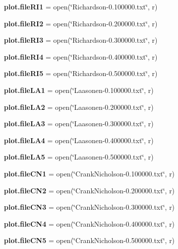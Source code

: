 \begin{DoxyCompactItemize}
\item 
\textbf{ plot.\+file\+R\+I1} = open(\char`\"{}Richardson-\/0.\+100000.txt\char`\"{}, \textquotesingle{}r\textquotesingle{})
\item 
\textbf{ plot.\+file\+R\+I2} = open(\char`\"{}Richardson-\/0.\+200000.txt\char`\"{}, \textquotesingle{}r\textquotesingle{})
\item 
\textbf{ plot.\+file\+R\+I3} = open(\char`\"{}Richardson-\/0.\+300000.txt\char`\"{}, \textquotesingle{}r\textquotesingle{})
\item 
\textbf{ plot.\+file\+R\+I4} = open(\char`\"{}Richardson-\/0.\+400000.txt\char`\"{}, \textquotesingle{}r\textquotesingle{})
\item 
\textbf{ plot.\+file\+R\+I5} = open(\char`\"{}Richardson-\/0.\+500000.txt\char`\"{}, \textquotesingle{}r\textquotesingle{})
\item 
\textbf{ plot.\+file\+L\+A1} = open(\char`\"{}Laasonen-\/0.\+100000.txt\char`\"{}, \textquotesingle{}r\textquotesingle{})
\item 
\textbf{ plot.\+file\+L\+A2} = open(\char`\"{}Laasonen-\/0.\+200000.txt\char`\"{}, \textquotesingle{}r\textquotesingle{})
\item 
\textbf{ plot.\+file\+L\+A3} = open(\char`\"{}Laasonen-\/0.\+300000.txt\char`\"{}, \textquotesingle{}r\textquotesingle{})
\item 
\textbf{ plot.\+file\+L\+A4} = open(\char`\"{}Laasonen-\/0.\+400000.txt\char`\"{}, \textquotesingle{}r\textquotesingle{})
\item 
\textbf{ plot.\+file\+L\+A5} = open(\char`\"{}Laasonen-\/0.\+500000.txt\char`\"{}, \textquotesingle{}r\textquotesingle{})
\item 
\textbf{ plot.\+file\+C\+N1} = open(\char`\"{}Crank\+Nicholson-\/0.\+100000.txt\char`\"{}, \textquotesingle{}r\textquotesingle{})
\item 
\textbf{ plot.\+file\+C\+N2} = open(\char`\"{}Crank\+Nicholson-\/0.\+200000.txt\char`\"{}, \textquotesingle{}r\textquotesingle{})
\item 
\textbf{ plot.\+file\+C\+N3} = open(\char`\"{}Crank\+Nicholson-\/0.\+300000.txt\char`\"{}, \textquotesingle{}r\textquotesingle{})
\item 
\textbf{ plot.\+file\+C\+N4} = open(\char`\"{}Crank\+Nicholson-\/0.\+400000.txt\char`\"{}, \textquotesingle{}r\textquotesingle{})
\item 
\textbf{ plot.\+file\+C\+N5} = open(\char`\"{}Crank\+Nicholson-\/0.\+500000.txt\char`\"{}, \textquotesingle{}r\textquotesingle{})
\item 

\end{DoxyCompactItemize}
